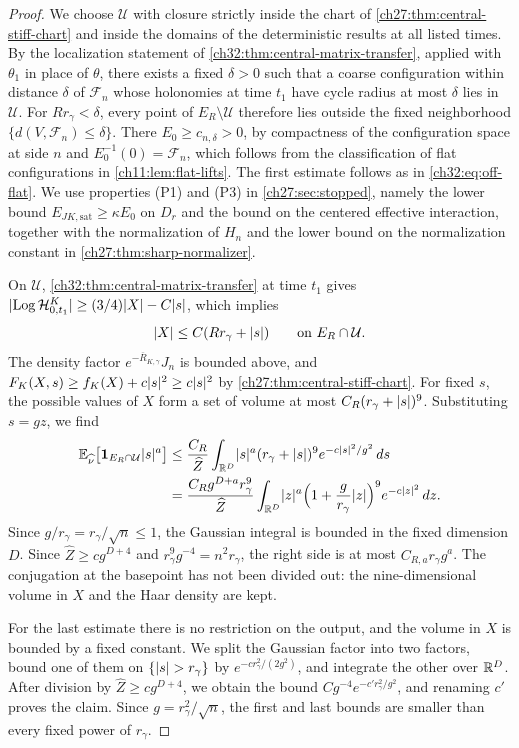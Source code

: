 \begin{proof}
We choose $\mathcal U$ with closure strictly inside the chart of \cref{ch27:thm:central-stiff-chart} and inside the domains of the deterministic results at all listed times. By the localization statement of \cref{ch32:thm:central-matrix-transfer}, applied with $\theta_1$ in place of $\theta$, there exists a fixed $\delta>0$ such that a coarse configuration within distance $\delta$ of $\mathcal F_n$ whose holonomies at time $t_1$ have cycle radius at most $\delta$ lies in $\mathcal U$. For $Rr_\gamma<\delta$, every point of $E_R\setminus\mathcal U$ therefore lies outside the fixed neighborhood $\{d(V,\mathcal F_n)\le\delta\}$. There $E_0\ge c_{n,\delta}>0$, by compactness of the configuration space at side $n$ and $E_0^{-1}(0)=\mathcal F_n$, which follows from the classification of flat configurations in \cref{ch11:lem:flat-lifts}. The first estimate follows as in \eqref{ch32:eq:off-flat}. We use properties (P1) and (P3) in \cref{ch27:sec:stopped}, namely the lower bound $E_{JK,\mathrm{sat}}\ge\kappa E_0$ on $D_r$ and the bound on the centered effective interaction, together with the normalization of $H_n$ and the lower bound on the normalization constant in \cref{ch27:thm:sharp-normalizer}.

On $\mathcal U$, \cref{ch32:thm:central-matrix-transfer} at time $t_1$ gives $\lvert \operatorname{Log}\mathcal H^K_{0,t_1}\rvert\ge(3/4)\lvert X\rvert-C\lvert s\rvert$, which implies
\[
 \lvert X\rvert\le C(Rr_\gamma+\lvert s\rvert)\qquad\text{on }E_R\cap\mathcal U.
\]
The density factor $e^{-\overline R_{K,\gamma}}J_n$ is bounded above, and $F_K(X,s)\ge f_K(X)+c\lvert s\rvert^2\ge c\lvert s\rvert^2$ by \cref{ch27:thm:central-stiff-chart}. For fixed $s$, the possible values of $X$ form a set of volume at most $C_R(r_\gamma+\lvert s\rvert)^9$. Substituting $s=gz$, we find
\[
 \begin{split}
 \mathbb E_{\widehat\nu}\bigl[\mathbf 1_{E_R\cap\mathcal U}\lvert s\rvert^a\bigr]
 &\le\frac{C_R}{\widehat Z}\int_{\mathbb R^D}\lvert s\rvert^a(r_\gamma+\lvert s\rvert)^9e^{-c\lvert s\rvert^2/g^2}\,ds\\
 &=\frac{C_Rg^{D+a}r_\gamma^9}{\widehat Z}\int_{\mathbb R^D}\lvert z\rvert^a\Bigl(1+\frac g{r_\gamma}\lvert z\rvert\Bigr)^9e^{-c\lvert z\rvert^2}\,dz.
 \end{split}
\]
Since $g/r_\gamma=r_\gamma/\sqrt n\le1$, the Gaussian integral is bounded in the fixed dimension $D$. Since $\widehat Z\ge cg^{D+4}$ and $r_\gamma^9g^{-4}=n^2r_\gamma$, the right side is at most $C_{R,a}r_\gamma g^a$. The conjugation at the basepoint has not been divided out: the nine-dimensional volume in $X$ and the Haar density are kept.

For the last estimate there is no restriction on the output, and the volume in $X$ is bounded by a fixed constant. We split the Gaussian factor into two factors, bound one of them on $\{\lvert s\rvert>r_\gamma\}$ by $e^{-cr_\gamma^2/(2g^2)}$, and integrate the other over $\mathbb R^D$. After division by $\widehat Z\ge cg^{D+4}$, we obtain the bound $Cg^{-4}e^{-c'r_\gamma^2/g^2}$, and renaming $c'$ proves the claim. Since $g=r_\gamma^2/\sqrt n$, the first and last bounds are smaller than every fixed power of $r_\gamma$.
\end{proof}


